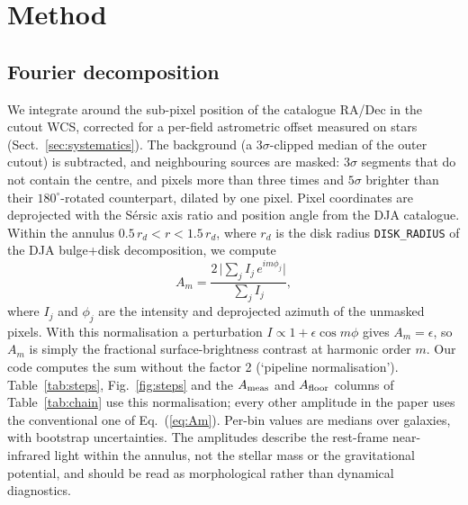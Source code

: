 \documentclass[fleqn,usenatbib]{mnras}
\begin{document}
\section{Method}\label{sec:method}

\subsection{Fourier decomposition}\label{sec:fourier}

We integrate around the sub-pixel position of the catalogue RA/Dec in the
cutout WCS, corrected for a per-field astrometric offset measured on stars
(Sect.~\ref{sec:systematics}). The background (a 3$\sigma$-clipped median of the
outer cutout) is subtracted, and neighbouring sources are masked: 3$\sigma$
segments that do not contain the centre, and pixels more than three times and
$5\sigma$ brighter than their $180^\circ$-rotated counterpart, dilated by one
pixel. Pixel coordinates are deprojected with the S\'ersic axis ratio and
position angle from the DJA catalogue. Within the annulus
$0.5\,r_d<r<1.5\,r_d$, where $r_d$ is the disk radius \texttt{DISK\_RADIUS} of
the DJA bulge+disk decomposition, we compute
\begin{equation}
A_m=\frac{2\,\bigl|\sum_j I_j\,e^{im\phi_j}\bigr|}{\sum_j I_j},
\label{eq:Am}
\end{equation}
where $I_j$ and $\phi_j$ are the intensity and deprojected azimuth of the
unmasked pixels. With this normalisation a perturbation
$I\propto1+\epsilon\cos m\phi$ gives $A_m=\epsilon$, so $A_m$ is simply the
fractional surface-brightness contrast at harmonic order $m$. Our code computes
the sum without the factor 2 (`pipeline normalisation'). Table~\ref{tab:steps},
Fig.~\ref{fig:steps} and the $A_{\rm meas}$ and $A_{\rm floor}$ columns of
Table~\ref{tab:chain} use this normalisation; every other amplitude in the paper
uses the conventional one of Eq.~(\ref{eq:Am}). Per-bin values are medians over
galaxies, with bootstrap uncertainties. The amplitudes describe the rest-frame
near-infrared light within the annulus, not the stellar mass or the
gravitational potential, and should be read as morphological rather than
dynamical diagnostics.
\end{document}
